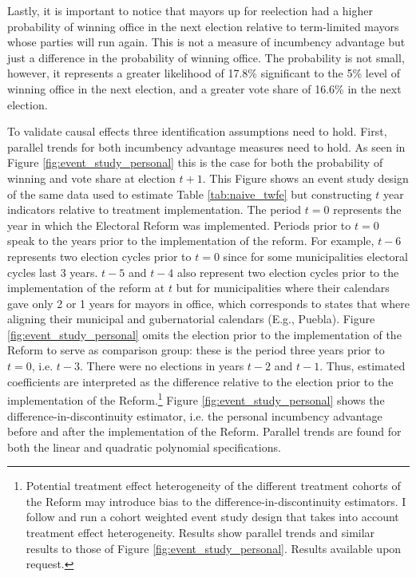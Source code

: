 \documentclass[12pt]{amsart}
\makeatletter
\def\subsection{\@startsection{subsection}{2}
	\z@{.8\linespacing\@plus.7\linespacing}{.7\linespacing}{\large}}
\numberwithin{equation}{section}
\theoremstyle{definition}
\theoremstyle{definition}
\theoremstyle{definition}
\makeatother
\begin{document}
Lastly, it is important to notice that mayors up for reelection had a higher probability of winning office in the next election relative to term-limited mayors whose parties will run again. This is not a measure of incumbency advantage but just a difference in the probability of winning office. The probability is not small, however, it represents a greater likelihood of 17.8\% significant to the 5\% level of winning office in the next election, and a greater vote share of 16.6\% in the next election. 
   
\subsection{Identification assumptions} 

To validate causal effects three identification assumptions need to hold. First, parallel trends for both incumbency advantage measures need to hold. As seen in Figure \ref{fig:event_study_personal}  this is the case for both the probability of winning and vote share at election $t+1$. This Figure shows an event study design of the same data used to estimate Table \ref{tab:naive_twfe} but constructing $t$ year indicators relative to treatment implementation. The period $t=0$ represents the year in which the Electoral Reform was implemented. Periods prior to $t=0$ speak to the years prior to the implementation of the reform. For example, $t-6$ represents two election cycles prior to $t=0$ since for some municipalities electoral cycles last 3 years.  $t-5$ and $t-4$ also represent two election cycles prior to the implementation of the reform at $t$ but for municipalities where their calendars gave only 2 or 1 years for mayors in office, which corresponds to states that where aligning their municipal and gubernatorial calendars (E.g., Puebla). Figure \ref{fig:event_study_personal} omits the election prior to the implementation of the Reform to serve as comparison group: these is the period three years prior to $t=0$, i.e. $t-3$. There were no elections in years $t-2$ and $t-1$. Thus, estimated coefficients are interpreted as the difference relative to the election prior to the implementation of the Reform.\footnote{Potential treatment effect heterogeneity of the different treatment cohorts of the Reform may introduce bias to the difference-in-discontinuity estimators. I follow \citet{abraham_sun_2020} and run a cohort weighted event study design that takes into account treatment effect heterogeneity. Results show parallel trends and similar results to those of  Figure \ref{fig:event_study_personal}. Results available upon request.} Figure \ref{fig:event_study_personal} shows the difference-in-discontinuity estimator, i.e. the personal incumbency advantage before and after the implementation of the Reform. Parallel trends are found for both the linear and quadratic polynomial specifications.  
\end{document}
